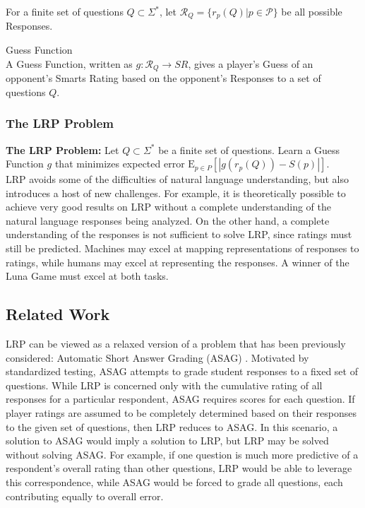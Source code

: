 \noindent For a finite set of questions $Q \subset \Sigma^*$, let $\mathcal{R}_{Q} = \{ r_p(Q) | p \in \mathcal{P} \}$ be all possible Responses.

\theoremstyle{definition}
\begin{definition}{Guess Function}\\
A Guess Function, written as $g : \mathcal{R}_{Q} \to SR$, gives a player's Guess of an opponent's Smarts Rating based on the opponent's Responses to a set of questions $Q$.
\end{definition}


\subsubsection{The LRP Problem}
\textbf{The LRP Problem:} Let $Q \subset \Sigma^*$ be a finite set of questions. Learn a Guess Function $g$ that minimizes expected error $\mathrm{E}_{p \in P}[|g(r_p(Q))-S(p)|]$. \\
LRP avoids some of the difficulties of natural language understanding, but also introduces a host of new challenges. For example, it is theoretically possible to achieve very good results on LRP without a complete understanding of the natural language responses being analyzed. On the other hand, a complete understanding of the responses is not sufficient to solve LRP, since ratings must still be predicted. Machines may excel at mapping representations of responses to ratings, while humans may excel at representing the responses. A winner of the Luna Game must excel at both tasks.


\subsection{Related Work}
LRP can be viewed as a relaxed version of a problem that has been previously considered: Automatic Short Answer Grading (ASAG) \cite{burrows15, pulman05, sukkarieh09, zia12}. Motivated by standardized testing, ASAG attempts to grade student responses to a fixed set of questions. While LRP is concerned only with the cumulative rating of all responses for a particular respondent, ASAG requires scores for each question. If player ratings are assumed to be completely determined based on their responses to the given set of questions, then LRP reduces to ASAG. In this scenario, a solution to ASAG would imply a solution to LRP, but LRP may be solved without solving ASAG. For example, if one question is much more predictive of a respondent's overall rating than other questions, LRP would be able to leverage this correspondence, while ASAG would be forced to grade all questions, each contributing equally to overall error. 

